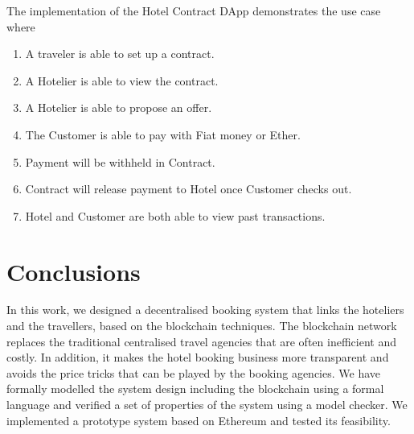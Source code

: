\documentclass{KERauth}
\begin{document}
The implementation of the Hotel Contract DApp demonstrates the use case where
\begin{enumerate}
\item  A traveler is able to set up a contract.
\item  A Hotelier is able to view the contract.
\item	A Hotelier is able to propose an offer.
\item	The Customer is able to pay with Fiat money or Ether.
\item	Payment will be withheld in Contract.
\item	Contract will release payment to Hotel once Customer checks out. 
\item	Hotel and Customer are both able to view past transactions.
\end{enumerate}

\section{Conclusions}

In this work, we designed a decentralised booking system that links the hoteliers and the travellers, based on the blockchain techniques. The blockchain network replaces the traditional centralised travel agencies that are often inefficient and costly. In addition, it makes the hotel booking business more transparent and avoids the price tricks that can be played by the booking agencies. We have formally modelled the system design including the blockchain using a formal language and verified a set of properties of the system using a model checker. We implemented a prototype system based on Ethereum and tested its feasibility. 
\end{document}
